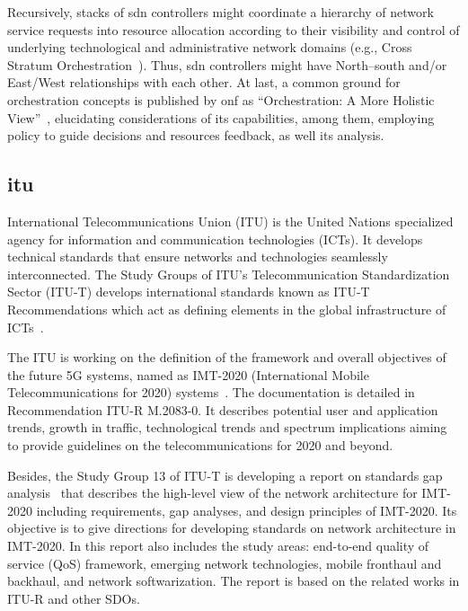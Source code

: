 Recursively, stacks of \gls{sdn} controllers might coordinate a hierarchy of network service requests into resource allocation according to their visibility and control of underlying technological and administrative network domains (e.g., Cross Stratum Orchestration~\cite{ONF:CSO:2017}). Thus, \gls{sdn} controllers might have North--south and/or East/West relationships with each other. At last, a common ground for orchestration concepts is published by \gls{onf} as ``Orchestration: A More Holistic View''~\cite{ONF:Orch:2017}, elucidating considerations of its capabilities, among them, employing policy to guide decisions and resources feedback, as well its analysis.  


\subsection {\acrfull{itu}}
International Telecommunications Union (ITU) is the United Nations specialized agency for information and communication technologies (ICTs). It develops technical standards that ensure networks and technologies seamlessly interconnected. The Study Groups of ITU’s Telecommunication Standardization Sector (ITU-T) develops international standards known as ITU-T Recommendations which act as defining elements in the global infrastructure of ICTs~\cite{ITUITU:World}.

The ITU is working on the definition of the framework and overall objectives of the future 5G systems, named as IMT-2020 (International Mobile Telecommunications for 2020) systems~\cite{ITU-R2015RecommendationBeyond}. The documentation is detailed in Recommendation ITU-R M.2083-0. It describes potential user and application trends, growth in traffic, technological trends and spectrum implications aiming to provide guidelines on the telecommunications for 2020 and beyond.

Besides, the Study Group 13 of ITU-T is developing a report on standards gap analysis~\cite{ITU-T2015FGAnalysis} that describes the high-level view of the network architecture for IMT-2020 including requirements, gap analyses, and design principles of IMT-2020. Its objective is to give directions for developing standards on network architecture in IMT-2020. In this report also includes the study areas:  end-to-end quality of service (QoS) framework, emerging network technologies, mobile fronthaul and backhaul, and network softwarization. The report is based on the related works in ITU-R and other SDOs.